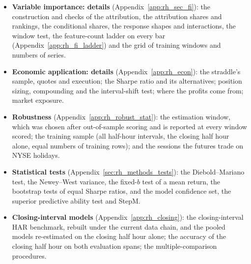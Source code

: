 \begin{itemize}
  benchmark.
\item \textbf{Variable importance: details} (Appendix~\ref{app:rh_sec_fi}): the construction and checks of the
  attribution, the attribution shares and rankings, the conditional shares, the response shapes and interactions, the
  window test, the feature-count ladder on every bar (Appendix~\ref{app:rh_fi_ladder}) and the grid of training
  windows and numbers of series.
\item \textbf{Economic application: details} (Appendix~\ref{app:rh_econ}): the straddle's sample, quotes and
  execution; the Sharpe ratio and its alternatives; position sizing, compounding and the interval-shift test;
  where the profits come from; market exposure.
\item \textbf{Robustness} (Appendix~\ref{app:rh_robust_stat}): the estimation window, which was chosen after
  out-of-sample scoring and is reported at every window scored; the training sample (all \rhdmNIntervals{}
  half-hour intervals, the closing half hour alone, equal numbers of training rows); and the sessions the futures
  trade on NYSE holidays.
\item \textbf{Statistical tests} (Appendix~\ref{sec:rh_methods_tests}): the Diebold--Mariano test, the Newey--West
  variance, the fixed-$b$ test of a mean return, the bootstrap tests of equal Sharpe ratios, and the model
  confidence set, the superior predictive ability test and StepM.
\item \textbf{Closing-interval models} (Appendix~\ref{app:rh_closing}): the closing-interval HAR benchmark, rebuilt
  under the current data chain, and the pooled models re-estimated on the closing half hour alone; the accuracy of
  the closing half hour on both evaluation spans; the multiple-comparison procedures.
\end{itemize}

